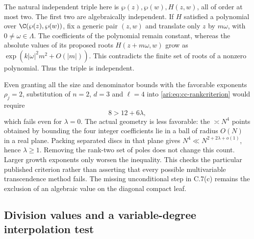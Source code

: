 The natural independent triple here is
$\wp(z),\wp(w),H(z,w)$, all of order at most two.
The first two are algebraically independent. If $H$ satisfied
a polynomial over $\C(\wp(z),\wp(w))$, fix a generic pair
$(z,w)$ and translate only $z$ by $m\omega$, with
$0\ne\omega\in\Lambda$. The coefficients of the polynomial
remain constant, whereas the absolute values of its proposed
roots $H(z+m\omega,w)$ grow as
$\exp(k|\omega|^2m^2+O(|m|))$. This contradicts the finite
set of roots of a nonzero polynomial. Thus the triple is
independent.

Even granting all the size and denominator bounds with the
favorable exponents $\rho_j=2$, substitution of
$n=2$, $d=3$ and $\ell=4$ into
\eqref{ari:eq:cc-rankcriterion} would require
\[
 8>12+6\lambda,
\]
which fails even for $\lambda=0$. The actual geometry is
less favorable: the $\asymp N^4$ points obtained by bounding
the four integer coefficients lie in a ball of radius $O(N)$
in a real plane. Packing separated discs in that plane gives
$N^4\ll N^{2+2\lambda+o(1)}$, hence $\lambda\ge1$.
Removing the rank-two set of poles does not change this count.
Larger growth exponents only worsen the inequality. This
checks the particular published criterion rather than asserting
that every possible multivariable transcendence method fails.
The missing unconditional step in C.7(c) remains the exclusion
of an algebraic value on the diagonal compact leaf.


\subsection{Division values and a variable-degree interpolation test}

